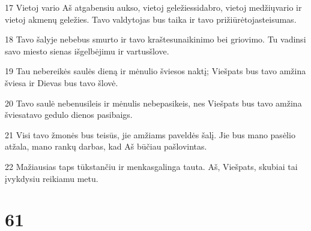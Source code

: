 \par 17 Vietoj vario Aš atgabensiu aukso, vietoj geležies­sidabro, vietoj medžių­vario ir vietoj akmenų­ geležies. Tavo valdytojas bus taika ir tavo prižiūrėtojas­teisumas. 
\par 18 Tavo šalyje nebebus smurto ir tavo krašte­sunaikinimo bei griovimo. Tu vadinsi savo miesto sienas išgelbėjimu ir vartus­šlove. 
\par 19 Tau nebereikės saulės dieną ir mėnulio šviesos naktį; Viešpats bus tavo amžina šviesa ir Dievas bus tavo šlovė. 
\par 20 Tavo saulė nebenusileis ir mėnulis nebepasikeis, nes Viešpats bus tavo amžina šviesa­tavo gedulo dienos pasibaigs. 
\par 21 Visi tavo žmonės bus teisūs, jie amžiams paveldės šalį. Jie bus mano pasėlio atžala, mano rankų darbas, kad Aš būčiau pašlovintas. 
\par 22 Mažiausias taps tūkstančiu ir menkas­galinga tauta. Aš, Viešpats, skubiai tai įvykdysiu reikiamu metu.



\chapter{61}


